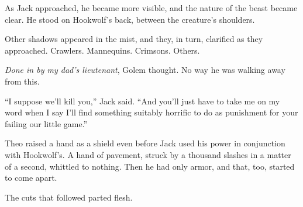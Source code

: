 As Jack approached, he became more visible, and the nature of the beast became clear.  He stood on Hookwolf's back, between the creature's shoulders.



Other shadows appeared in the mist, and they, in turn, clarified as they approached.  Crawlers.  Mannequins.  Crimsons.  Others.



\emph{Done in by my dad's lieutenant}, Golem thought.  No way he was walking away from this.



``I suppose we'll kill you,'' Jack said.  ``And you'll just have to take me on my word when I say I'll find something suitably horrific to do as punishment for your failing our little game.''



Theo raised a hand as a shield even before Jack used his power in conjunction with Hookwolf's.  A hand of pavement, struck by a thousand slashes in a matter of a second, whittled to nothing.  Then he had only armor, and that, too, started to come apart.



The cuts that followed parted flesh.






